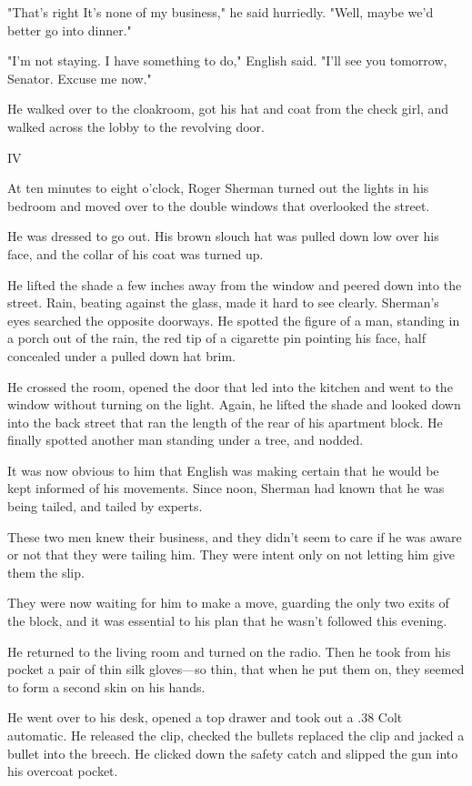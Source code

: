 \documentclass{novel}
\begin{document}
"That's right It's none of my business," he said hurriedly. "Well, maybe we'd better go into dinner."

"I'm not staying. I have something to do," English said. "I'll see you tomorrow, Senator. Excuse me now."

He walked over to the cloakroom, got his hat and coat from the check girl, and walked across the lobby to the revolving door.



IV

At ten minutes to eight o'clock, Roger Sherman turned out the lights in his bedroom and moved over to the double windows that overlooked the street.

He was dressed to go out. His brown slouch hat was pulled down low over his face, and the collar of his coat was turned up.

He lifted the shade a few inches away from the window and peered down into the street. Rain, beating against the glass, made it hard to see clearly. Sherman's eyes searched the opposite doorways. He spotted the figure of a man, standing in a porch out of the rain, the red tip of a cigarette pin pointing his face, half concealed under a pulled down hat brim.

He crossed the room, opened the door that led into the kitchen and went to the window without turning on the light. Again, he lifted the shade and looked down into the back street that ran the length of the rear of his apartment block. He finally spotted another man standing under a tree, and nodded.

It was now obvious to him that English was making certain that he would be kept informed of his movements. Since noon, Sherman had known that he was being tailed, and tailed by experts.

These two men knew their business, and they didn't seem to care if he was aware or not that they were tailing him. They were intent only on not letting him give them the slip.

They were now waiting for him to make a move, guarding the only two exits of the block, and it was essential to his plan that he wasn't followed this evening.

He returned to the living room and turned on the radio. Then he took from his pocket a pair of thin silk gloves—so thin, that when he put them on, they seemed to form a second skin on his hands.

He went over to his desk, opened a top drawer and took out a .38 Colt automatic. He released the clip, checked the bullets replaced the clip and jacked a bullet into the breech. He clicked down the safety catch and slipped the gun into his overcoat pocket.
\end{document}
